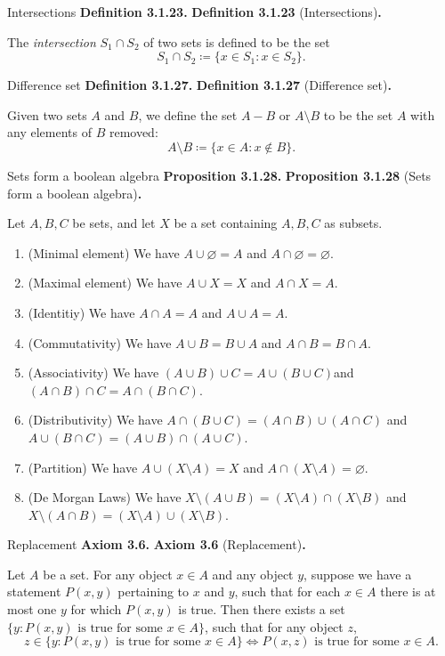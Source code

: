 \documentclass[12pt]{article}
\newenvironment{df}[2][\relax]{
\vspace{4mm}
    \noindent\setlength{\parskip}{1em}%
    \ifx#1\relax%
        \textbf{#2. }%
    \else%
        \textbf{#2} (#1)\textbf{. }%
    \fi%
    \ignorespaces%
}{}
\theoremstyle{remark}
\begin{document}
\begin{df}[Intersections]{Definition 3.1.23}
    The \emph{intersection} $S_1 \cap S_2$ of two sets is defined to be the set
    {\setlength{\belowdisplayskip}{-10pt} \setlength{\belowdisplayshortskip}{-10pt}
    \[
        S_1 \cap S_2 \coloneqq \{ x \in S_1 : x \in S_2 \}.
    \]
    }
\end{df}

\begin{df}[Difference set]{Definition 3.1.27}
    Given two sets $A$ and $B$, we define the set $A - B$ or $A \setminus B$ to be the set $A$ with any elements of $B$ removed:
    {\setlength{\belowdisplayskip}{-10pt} \setlength{\belowdisplayshortskip}{-10pt}
    \[
        A \setminus B \coloneqq \{ x \in A : x \notin B \}.
    \]
    }
\end{df}


\begin{df}[Sets form a boolean algebra]{Proposition 3.1.28}
    Let $A, B, C$ be sets, and let $X$ be a set containing $A, B, C$ as subsets.
    \begin{enumerate}[topsep=0mm,parsep=0mm,label=(\alph*)]
        \item (Minimal element) We have $A \cup \varnothing = A$ and $A \cap \varnothing = \varnothing$.
        \item (Maximal element) We have $A \cup X = X$ and $A \cap X = A$.
        \item (Identitiy) We have $A \cap A= A$ and $A \cup A = A$.
        \item (Commutativity) We have $A \cup B = B \cup A$ and $A \cap B = B \cap A$.
        \item (Associativity) We have $(A \cup B) \cup C = A \cup (B \cup C)$and $(A \cap B) \cap C = A \cap (B \cap C)$.
        \item (Distributivity) We have $A \cap (B \cup C) = (A \cap B) \cup (A \cap C)$ and $A \cup (B \cap C)=(A \cup B) \cap (A \cup C)$.
        \item (Partition) We have $A \cup (X \setminus A) = X$ and $A \cap (X \setminus A) = \varnothing$.
        \item (De Morgan Laws) We have $X \setminus (A \cup B) = (X \setminus A) \cap (X \setminus B)$ and $X \setminus (A \cap B) = (X \setminus A) \cup (X \setminus B)$.
    \end{enumerate}
\end{df}


\begin{df}[Replacement]{Axiom 3.6}
    Let $A$ be a set.
    For any object $x \in A$ and any object $y$, suppose we have a statement $P(x, y)$ pertaining to $x$ and $y$, such that for each $x \in A$ there is at most one $y$ for which $P(x, y)$ is true.
    Then there exists a set $\{ y : P(x, y) \text{ is true for some } x \in A \}$, such that for any object $z$,
    {\setlength{\belowdisplayskip}{-10pt} \setlength{\belowdisplayshortskip}{-10pt}
    \[
        z \in \{ y : P(x, y) \text{ is true for some } x \in A \} \iff P(x, z) \text{ is true for some } x \in A.
    \]
    }
\end{df}
\end{document}
